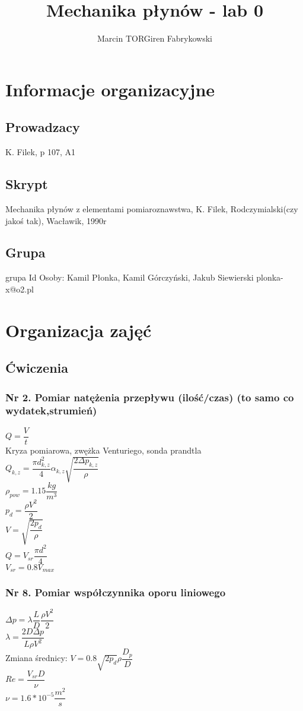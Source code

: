 \documentclass[a4paper,12pt]{article}
\title{Mechanika płynów - lab 0}
\author{Marcin TORGiren Fabrykowski}
\begin{document}
\maketitle
\newpage
\tableofcontents
\newpage
\section{Informacje organizacyjne}
\subsection{Prowadzacy}
K. Filek, p 107, A1
\subsection{Skrypt}
Mechanika płynów z elementami pomiaroznawstwa, K. Filek,  Rodczymialski(czy jakoś tak), Wacławik, 1990r
\subsection{Grupa}
grupa Id
Osoby: Kamil Płonka, Kamil Górczyński, Jakub Siewierski
plonka-x@o2.pl
\section{Organizacja zajęć}
\subsection{Ćwiczenia}
\subsubsection{Nr 2. Pomiar natężenia przepływu (ilość/czas) (to samo co wydatek,strumień)}
	$Q=\dfrac{V}{t}$\\
	Kryza pomiarowa, zwężka Venturiego, sonda prandtla\\
	$Q_{k,z}=\dfrac{\pi d^2_{k,z}}{4}\alpha_{k,z}\sqrt{\dfrac{2\Delta p_{k,z}}{\rho}}$\\
	$\rho_{pow}= 1.15\dfrac{kg}{m^3}$\\
	$p_d=\dfrac{\rho V^2}{2}$\\
	$V=\sqrt{\dfrac{2p_d}{\rho}}$\\
	$Q=V_{sr}\dfrac{\pi d^2}{4}$\\
	$V_{sr}=0.8V_{max}$\\
\subsubsection{Nr 8. Pomiar współczynnika oporu liniowego}
	$\Delta p=\lambda \dfrac{L}{D}\dfrac{\rho V^2}{2}$\\
	$\lambda=\dfrac{2D \Delta p}{L\rho V^2}$\\
	Zmiana średnicy: $V=0.8 \sqrt{2p_d}{\rho} \dfrac{D_p}{D}$\\
	$Re=\dfrac{V_{sr}D}{\nu}$\\
	$\nu=1.6*10^{-5} \dfrac{m^2}{s}$\\
\end{document}
